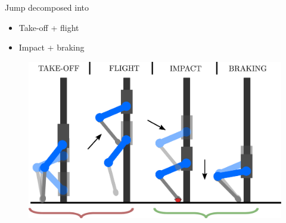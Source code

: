 \documentclass[aspectratio=169]{beamer}
\begin{document}
\begin{frame}
\begin{multicols}{2}
\vfill\null
Jump decomposed into
\begin{itemize}
\item Take-off + flight
\item Impact + braking
\end{itemize}
\vfill\null
\columnbreak
\vfill\null
\begin{figure}
    \centering
    \includegraphics[width=1.0\columnwidth]{beamer_imgs/impact_opt_intro/jump_phases.pdf}
\end{figure}
\end{multicols}
\end{frame}


%

\end{document}
